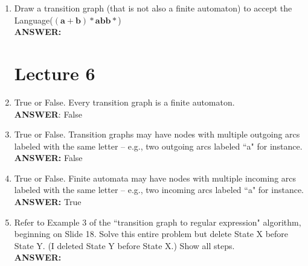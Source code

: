 \documentclass{article}
\begin{document}
\begin{enumerate}

    \item Draw a transition graph (that is not also a finite automaton) to
        accept the Language($\bm{(a+b)*abb*}$) \\
        \textbf{ANSWER:}\\

\section{Lecture 6}

    \item True or False. Every transition graph is a finite automaton. \\
        \textbf{ANSWER}: False

    \item True or False. Transition graphs may have nodes with multiple outgoing arcs labeled 
    with the same letter -- e.g., two outgoing arcs labeled ``a" for instance. \\
        \textbf{ANSWER:} False

    \item True or False. Finite automata may have nodes with multiple incoming arcs labeled 
    with the same letter -- e.g., two incoming arcs labeled ``a" for instance. \\
        \textbf{ANSWER:} True
    
    \item Refer to Example 3 of the ``transition graph to regular expression" algorithm, 
    beginning on Slide 18. Solve this entire problem but delete State X before State Y. (I deleted 
    State Y before State X.) Show all steps. \\
        \textbf{ANSWER:} \\
\end{enumerate}
\end{document}
